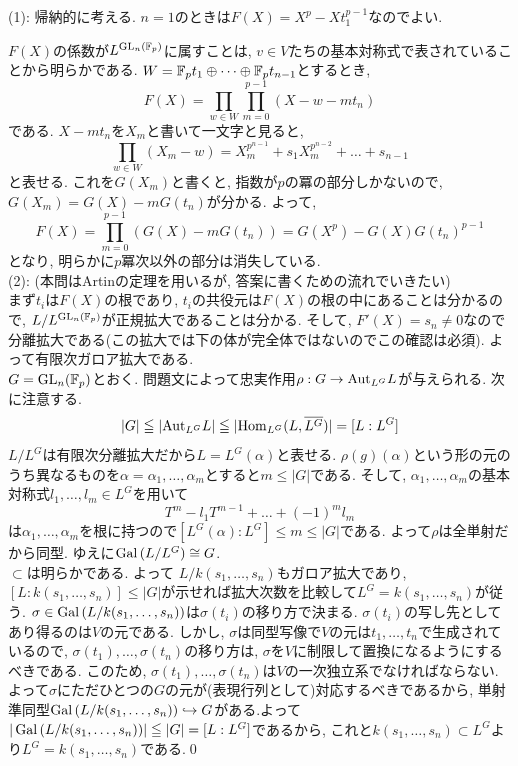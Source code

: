 \begin{egans}
(1): 帰納的に考える. $n=1$のときは$F(X) = X^{p} - Xt_1^{p-1}$なのでよい.  \par
$F(X)$の係数が$L^{\mathrm{GL}_{n}(\mathbb{F}_{p})}$に属すことは, $v\in V$たちの基本対称式で表されていることから明らかである.
$W=\mathbb{F}_{p}t_1 \oplus \dots \oplus \mathbb{F}_{p}t_{n-1}$とするとき, \[F(X) = \prod_{w\in W}\prod_{m=0}^{p-1} (X-w-mt_n)\]
である. $X-mt_n$を$X_m$と書いて一文字と見ると,
\[\prod_{w\in W} (X_m - w) = X_m^{p^{n-1}} + s_1X_m^{p^{n-2}} + \dots + s_{n-1} \]
と表せる. これを$G(X_m)$と書くと, 指数が$p$の冪の部分しかないので, $G(X_m) = G(X) - mG(t_n)$が分かる. よって,
\[F(X) = \prod_{m=0}^{p-1} (G(X) - mG(t_n)) = G(X^{p}) - G(X) G(t_n)^{p-1} \]
となり, 明らかに$p$冪次以外の部分は消失している. \\
(2): (本問はArtinの定理を用いるが, 答案に書くための流れでいきたい)\\
まず$t_i$は$F(X)$の根であり, $t_i$の共役元は$F(X)$の根の中にあることは分かるので, $L/L^{\mathrm{GL}_{n}(\mathbb{F}_p)}$が正規拡大であることは分かる. そして, $F'(X) = s_n \neq 0$なので分離拡大である(この拡大では下の体が完全体ではないのでこの確認は必須). よって有限次ガロア拡大である. \\
 $G=\mathrm{GL}_{n}(\mathbb{F}_p)$とおく. 問題文によって忠実作用$\rho:G\to \mathrm{Aut}_{L^{G}}L$が与えられる. 次に注意する.
\[|G| \leqq |\mathrm{Aut}_{L^G}L| \leqq |\mathrm{Hom}_{L^G}(L,\overline{L^G})| = [L:L^G]\]
$L/L^G$は有限次分離拡大だから$L=L^G(\alpha)$と表せる. $\rho(g)(\alpha)$という形の元のうち異なるものを$\alpha=\alpha_1,\dots, \alpha_m$とすると$m\leq |G|$である. そして, $\alpha_1,\dots, \alpha_m$の基本対称式$l_1,\dots, l_m\in L^G$を用いて
\[T^m - l_1T^{m-1} + \dots + (-1)^{m}l_m\]
は$\alpha_1,\dots, \alpha_m$を根に持つので$[L^G(\alpha):L^G]\leq m \leq |G|$である. よって$\rho$は全単射だから同型. ゆえに$\operatorname{Gal}{(L/L^G)}\cong G$. \\
 $\subset$は明らかである. よって $L/k(s_1,\dots,s_n)$もガロア拡大であり, $[L:k(s_1,\dots, s_n)] \leq |G|$が示せれば拡大次数を比較して$L^G=k(s_1,\dots, s_n)$が従う.
$\sigma\in \operatorname{Gal}{(L/k(s_1,\dots, s_n))}$は$\sigma(t_i)$の移り方で決まる. $\sigma(t_i)$の写し先としてあり得るのは$V$の元である. しかし, $\sigma$は同型写像で$V$の元は$t_1,\dots, t_n$で生成されているので, $\sigma(t_1),\dots, \sigma(t_n)$の移り方は, $\sigma$を$V$に制限して置換になるようにするべきである. このため, $\sigma(t_1),\dots, \sigma(t_n)$は$V$の一次独立系でなければならない. よって$\sigma$にただひとつの$G$の元が(表現行列として)対応するべきであるから, 単射準同型$\operatorname{Gal}{(L/k(s_1,\dots, s_n))}\hookrightarrow G$がある.よって$|\operatorname{Gal}{(L/k(s_1,\dots, s_n))}|\leqq |G| = [L:L^G]$であるから, これと$k(s_1,\dots, s_n)\subset L^G$より$L^G = k(s_1,\dots, s_n)$である.\qed
\end{egans}




